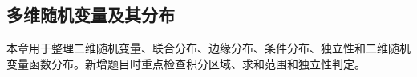 \subsection{多维随机变量及其分布}

\begin{knowledgeBox}
本章用于整理二维随机变量、联合分布、边缘分布、条件分布、独立性和二维随机变量函数分布。新增题目时重点检查积分区域、求和范围和独立性判定。
\end{knowledgeBox}
